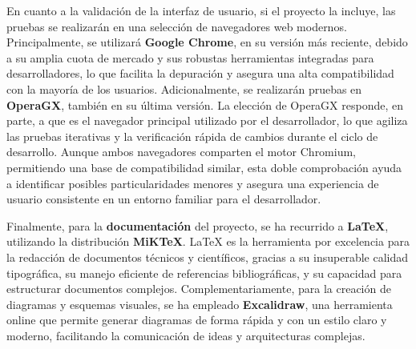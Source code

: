 En cuanto a la validación de la interfaz de usuario, si el proyecto la incluye, las pruebas se realizarán en una selección de navegadores web modernos. Principalmente, se utilizará \textbf{Google Chrome}, en su versión más reciente, debido a su amplia cuota de mercado y sus robustas herramientas integradas para desarrolladores, lo que facilita la depuración y asegura una alta compatibilidad con la mayoría de los usuarios. Adicionalmente, se realizarán pruebas en \textbf{OperaGX}, también en su última versión. La elección de OperaGX responde, en parte, a que es el navegador principal utilizado por el desarrollador, lo que agiliza las pruebas iterativas y la verificación rápida de cambios durante el ciclo de desarrollo. Aunque ambos navegadores comparten el motor Chromium, permitiendo una base de compatibilidad similar, esta doble comprobación ayuda a identificar posibles particularidades menores y asegura una experiencia de usuario consistente en un entorno familiar para el desarrollador.

Finalmente, para la \textbf{documentación} del proyecto, se ha recurrido a \textbf{LaTeX}, utilizando la distribución \textbf{MiKTeX}. LaTeX es la herramienta por excelencia para la redacción de documentos técnicos y científicos, gracias a su insuperable calidad tipográfica, su manejo eficiente de referencias bibliográficas, y su capacidad para estructurar documentos complejos. Complementariamente, para la creación de diagramas y esquemas visuales, se ha empleado \textbf{Excalidraw}, una herramienta online que permite generar diagramas de forma rápida y con un estilo claro y moderno, facilitando la comunicación de ideas y arquitecturas complejas.